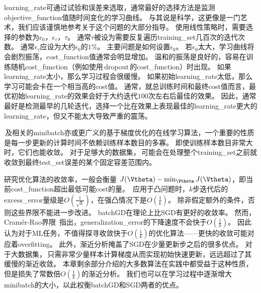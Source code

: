 
\gls{learning_rate}可通过试验和误差来选取，通常最好的选择方法是监测\gls{objective_function}值随时间变化的学习曲线。
与其说是科学，这更像是一门艺术，我们应该谨慎地参考关于这个问题的大部分指导。
使用线性策略时，需要选择的参数为$\epsilon_0$，$\epsilon_\tau$，$\tau$。  
通常$\tau$被设为需要反复遍历\gls{training_set}几百次的迭代次数。
通常$\epsilon_\tau$应设为大约$\epsilon_0$的$1\%$。
主要问题是如何设置$\epsilon_0$。
若$\epsilon_0$太大，学习曲线将会剧烈振荡，\gls{cost_function}值通常会明显增加。
温和的振荡是良好的，容易在训练随机\gls{cost_function}（例如使用\,\gls{dropout}\,的\gls{cost_function}）时出现。
如果\gls{learning_rate}太小，那么学习过程会很缓慢。
如果初始\gls{learning_rate}太低，那么学习可能会卡在一个相当高的\gls{cost}值。
通常，就总训练时间和最终\gls{cost}值而言，最优初始\gls{learning_rate}的效果会好于大约迭代$100$次左右后最佳的效果。
因此，通常最好是检测最早的几轮迭代，选择一个比在效果上表现最佳的\gls{learning_rate}更大的\gls{learning_rate}，但又不能太大导致严重的震荡。  


\,及相关的\gls{minibatch}亦或更广义的基于梯度优化的在线学习算法，一个重要的性质是每一步更新的计算时间不依赖训练样本数目的多寡。
即使训练样本数目非常大时，它们也能收敛。
对于足够大的数据集，\,可能会在处理整个\gls{training_set}之前就收敛到最终\gls{test_set}误差的某个固定容差范围内。



研究优化算法的收敛率，一般会衡量 $J(\Vtheta) - \min_{\Vtheta} J(\Vtheta)$，即当前\gls{cost_function}超出最低可能\gls{cost}的量。
\,应用于凸问题时，$k$步迭代后的\gls{excess_error}量级是$O(\frac{1}{\sqrt{k}})$，在强凸情况下是$O(\frac{1}{k})$。
除非假定额外的条件，否则这些界限不能进一步改进。
\gls{batch}\gls{GD}在理论上比\gls{SGD}有更好的收敛率。
然而，Cram\'er-Rao界限~\citep{Cramer-1946,Rao-1945}指出，\gls{generalization_error}的下降速度不会快于$O(\frac{1}{k})$。
\cite{Bottou-Bousquet-2008}因此认为对于\gls{ML}任务，不值得探寻收敛快于$O(\frac{1}{k})$的优化算法——更快的收敛可能对应着\gls{overfitting}。
此外，渐近分析掩盖了\gls{SGD}在少量更新步之后的很多优点。
对于大数据集，\,只需非常少量样本计算梯度从而实现初始快速更新，远远超过了其缓慢的渐近收敛。
本章剩余部分介绍的大多数算法在实践中都受益于这种性质，但是损失了常数倍$O(\frac{1}{k})$的渐近分析。
我们也可以在学习过程中逐渐增大\gls{minibatch}的大小，以此权衡\gls{batch}\gls{GD}和\gls{SGD}两者的优点。

